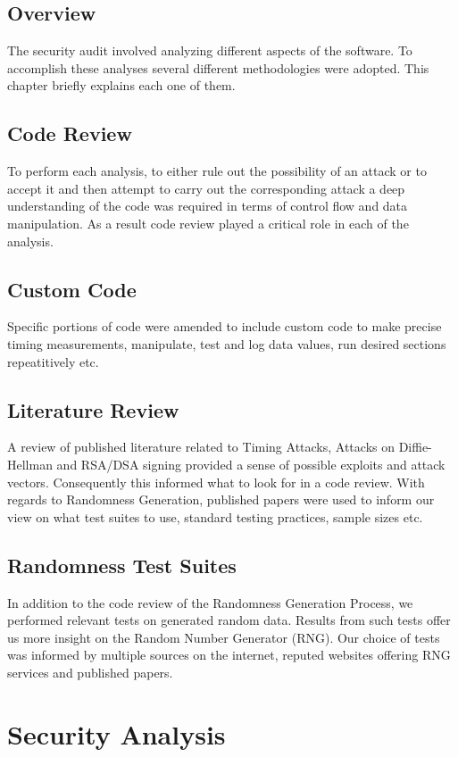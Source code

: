 \documentclass{bhamthesis}
\begin{document}
\section{Overview}
The security audit involved analyzing different aspects of the software. To accomplish these analyses several different methodologies were adopted. This chapter briefly explains each one of them.
\section{Code Review}
To perform each analysis, to either rule out the possibility of an attack or to accept it and then attempt to carry out the corresponding attack a deep understanding of the code was required in terms of control flow and data manipulation. As a result code review played a critical role in each of the analysis.
\section{Custom Code}
Specific portions of code were amended to include custom code to make precise timing measurements, manipulate, test and log data values, run desired sections repeatitively etc.
\section{Literature Review}
A review of published literature related to Timing Attacks, Attacks on Diffie-Hellman and RSA/DSA signing provided a sense of possible exploits and attack vectors. Consequently this informed what to look for in a code review. With regards to Randomness Generation, published papers were used to inform our view on what test suites to use, standard testing practices, sample sizes etc.
\section{Randomness Test Suites}
In addition to the code review of the Randomness Generation Process, we performed relevant tests on generated random data. Results from such tests offer us more insight on the Random Number Generator (RNG). Our choice of tests was informed by multiple sources on the internet, reputed websites offering RNG services and published papers.
\chapter{Security Analysis}
\end{document}

